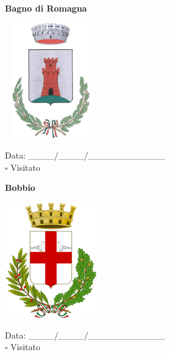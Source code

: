 \documentclass[a5paper,12pt]{article}
\begin{document}
\noindent
\begin{minipage}[t]{0.45\textwidth}
    \begin{center}
        \textbf{Bagno di Romagna}
    \end{center}
    \vspace{-0.5cm} %
    \begin{center}
        \includegraphics[height= 5cm, width=4cm]{Emilia Romagna/Stemma Bagno di Romagna.png}
    \end{center}
    \vspace{-0.4cm} %
    \begin{flushleft}
        Data: \_\_\_\_/\_\_\_\_/\_\_\_\_\_\_\_\_\_\_\_\_ \\
        $\square$ Visitato
    \end{flushleft}
\end{minipage}
\hfill
\noindent
\begin{minipage}[t]{0.45\textwidth}
    \begin{center}
        \textbf{Bobbio}
    \end{center}
    \vspace{-0.5cm} %
    \begin{center}
        \includegraphics[height= 5cm, width=4cm]{Emilia Romagna/Stemma Bobbio.png}
    \end{center}
    \vspace{-0.4cm} %
    \begin{flushleft}
        Data: \_\_\_\_/\_\_\_\_/\_\_\_\_\_\_\_\_\_\_\_\_ \\
        $\square$ Visitato
    \end{flushleft}
\end{minipage}
\end{document}
